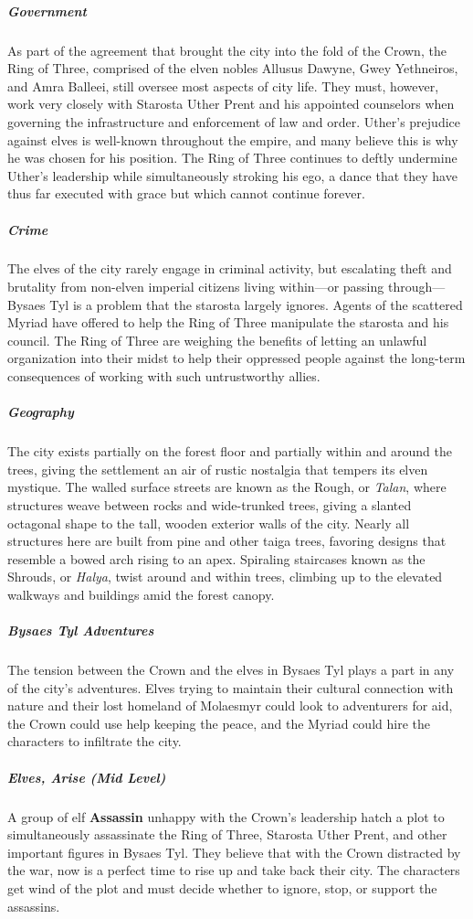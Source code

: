 \documentclass[10pt,a4paper,twoside,bg=print,twocolumn,openany,nodeprecatedcode]{dndbook}
\begin{document}
\subparagraph{Government}
As part of the agreement that brought the city into the fold of the Crown, the Ring of Three, comprised of the elven nobles Allusus Dawyne, Gwey Yethneiros, and Amra Balleei, still oversee most aspects of city life. They must, however, work very closely with Starosta Uther Prent and his appointed counselors when governing the infrastructure and enforcement of law and order. Uther's prejudice against elves is well-known throughout the empire, and many believe this is why he was chosen for his position. The Ring of Three continues to deftly undermine Uther's leadership while simultaneously stroking his ego, a dance that they have thus far executed with grace but which cannot continue forever.

\subparagraph{Crime}
The elves of the city rarely engage in criminal activity, but escalating theft and brutality from non-elven imperial citizens living within—or passing through—Bysaes Tyl is a problem that the starosta largely ignores. Agents of the scattered Myriad have offered to help the Ring of Three manipulate the starosta and his council. The Ring of Three are weighing the benefits of letting an unlawful organization into their midst to help their oppressed people against the long-term consequences of working with such untrustworthy allies.

\subparagraph{Geography}
The city exists partially on the forest floor and partially within and around the trees, giving the settlement an air of rustic nostalgia that tempers its elven mystique. The walled surface streets are known as the Rough, or \textit{Talan}, where structures weave between rocks and wide-trunked trees, giving a slanted octagonal shape to the tall, wooden exterior walls of the city. Nearly all structures here are built from pine and other taiga trees, favoring designs that resemble a bowed arch rising to an apex. Spiraling staircases known as the Shrouds, or \textit{Halya}, twist around and within trees, climbing up to the elevated walkways and buildings amid the forest canopy.

\subparagraph{Bysaes Tyl Adventures}
The tension between the Crown and the elves in Bysaes Tyl plays a part in any of the city's adventures. Elves trying to maintain their cultural connection with nature and their lost homeland of Molaesmyr could look to adventurers for aid, the Crown could use help keeping the peace, and the Myriad could hire the characters to infiltrate the city.

\subparagraph{Elves, Arise (Mid Level)}
A group of elf \textbf{Assassin} unhappy with the Crown's leadership hatch a plot to simultaneously assassinate the Ring of Three, Starosta Uther Prent, and other important figures in Bysaes Tyl. They believe that with the Crown distracted by the war, now is a perfect time to rise up and take back their city. The characters get wind of the plot and must decide whether to ignore, stop, or support the assassins.
\end{document}
